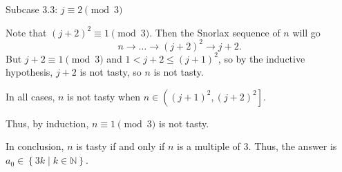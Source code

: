 Subcase 3.3: $j\equiv2\pmod3$

Note that $\left(j+2\right)^2\equiv1\pmod3$. Then the Snorlax sequence of $n$ will go \[n\rightarrow\ldots\rightarrow\left(j+2\right)^2\rightarrow j+2.\] But $j+2\equiv1\pmod3$ and $1<j+2\leq\left(j+1\right)^2$, so by the inductive hypothesis, $j+2$ is not tasty, so $n$ is not tasty.

In all cases, $n$ is not tasty when $n\in\left(\left(j+1\right)^2,\left(j+2\right)^2\right]$.

Thus, by induction, $n\equiv1\pmod3$ is not tasty.

In conclusion, $n$ is tasty if and only if $n$ is a multiple of $3$. Thus, the answer is $\boxed{a_0\in\left\{3k\mid k\in\mathbb{N}\right\}}$.